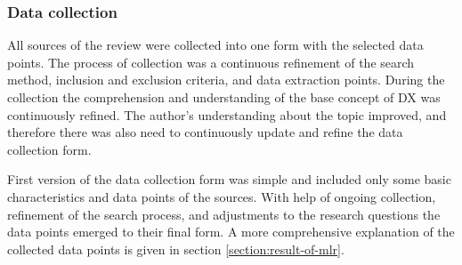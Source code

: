 \documentclass[english, 12pt, a4paper, sci, utf8, a-1b, online]{aaltothesis}
\begin{document}
\subsubsection{Data collection}

All sources of the review were collected into one form with the selected data points. The process of collection was a continuous refinement of the search method, inclusion and exclusion criteria, and data extraction points. During the collection the comprehension and understanding of the base concept of DX was continuously refined. The author's understanding about the topic improved, and therefore there was also need to continuously update and refine the data collection form.

First version of the data collection form was simple and included only some basic characteristics and data points of the sources. With help of ongoing collection, refinement of the search process, and adjustments to the research questions the data points emerged to their final form. A more comprehensive explanation of the collected data points is given in section \ref{section:result-of-mlr}.

\end{document}
